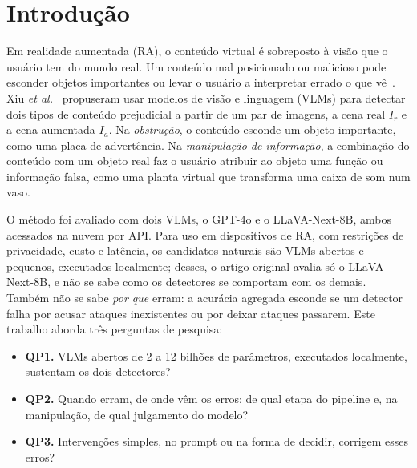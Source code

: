 \documentclass[conference]{IEEEtran}
\newcommand{\Ir}{I_r}
\newcommand{\Ia}{I_a}
\begin{document}
\section{Introdução}

Em realidade aumentada (RA), o conteúdo virtual é sobreposto à visão que o usuário tem do mundo real.
Um conteúdo mal posicionado ou malicioso pode esconder objetos importantes ou levar o usuário a
interpretar errado o que vê~\cite{roesner2014,arya}. Xiu \emph{et al.}~\cite{viddar} propuseram usar
modelos de visão e linguagem (VLMs) para detectar dois tipos de conteúdo prejudicial a partir de um par
de imagens, a cena real $\Ir$ e a cena aumentada $\Ia$. Na \emph{obstrução}, o conteúdo esconde um objeto
importante, como uma placa de advertência. Na \emph{manipulação de informação}, a combinação do conteúdo
com um objeto real faz o usuário atribuir ao objeto uma função ou informação falsa, como uma planta
virtual que transforma uma caixa de som num vaso.

O método foi avaliado com dois VLMs, o GPT-4o e o LLaVA-Next-8B, ambos acessados na nuvem por API. Para uso em dispositivos de
RA, com restrições de privacidade, custo e latência, os candidatos naturais são VLMs abertos e
pequenos, executados localmente; desses, o artigo original avalia só o LLaVA-Next-8B, e não se sabe como
os detectores se comportam com os demais. Também não se
sabe \emph{por que} erram: a acurácia agregada esconde se um detector falha por acusar ataques
inexistentes ou por deixar ataques passarem. Este trabalho aborda três perguntas de pesquisa:
\begin{itemize}
\item \textbf{QP1.} VLMs abertos de 2 a 12 bilhões de parâmetros, executados localmente, sustentam os dois
  detectores?
\item \textbf{QP2.} Quando erram, de onde vêm os erros: de qual etapa do pipeline e, na manipulação, de
  qual julgamento do modelo?
\item \textbf{QP3.} Intervenções simples, no prompt ou na forma de decidir, corrigem esses erros?
\end{itemize}
\end{document}
